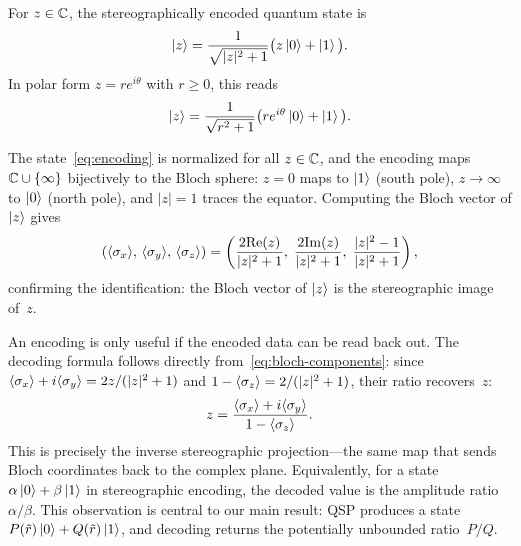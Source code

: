 \begin{definition}
	\label{def:stereo-encoding}
	For $z \in \mathbb{C}$, the stereographically encoded quantum state is
	\begin{equation}
		\ket{z} = \frac{1}{\sqrt{|z|^2 + 1}}\big(z\ket{0} + \ket{1}\big).
		\label{eq:encoding}
	\end{equation}
	In polar form $z = re^{i\theta}$ with $r \geq 0$, this reads
	\begin{equation}
		\ket{z} = \frac{1}{\sqrt{r^2+1}}\big(re^{i\theta}\ket{0} + \ket{1}\big).
		\label{eq:encoding-polar}
	\end{equation}
\end{definition}

The state~\eqref{eq:encoding} is normalized for all $z \in \mathbb{C}$,
and the encoding maps $\mathbb{C} \cup \{\infty\}$ bijectively to the
Bloch sphere: $z = 0$ maps to $\ket{1}$ (south pole),
$z \to \infty$ to $\ket{0}$ (north pole), and $|z| = 1$ traces
the equator.  Computing the Bloch vector of $\ket{z}$ gives
\begin{equation}
	\left(\langle\sigma_x\rangle,\,
	\langle\sigma_y\rangle,\,
	\langle\sigma_z\rangle\right) =
	\left(\frac{2\mathrm{Re}(z)}{|z|^2+1},\;
	\frac{2\mathrm{Im}(z)}{|z|^2+1},\;
	\frac{|z|^2-1}{|z|^2+1}\right),
	\label{eq:bloch-components}
\end{equation}
confirming the identification: the Bloch vector of $\ket{z}$ is
the stereographic image of~$z$.

An encoding is only useful if the encoded data can be read back
out.  The decoding formula follows directly
from~\eqref{eq:bloch-components}: since
$\langle\sigma_x\rangle + i\langle\sigma_y\rangle = 2z/(|z|^2+1)$
and $1 - \langle\sigma_z\rangle = 2/(|z|^2+1)$, their ratio
recovers~$z$:
\begin{equation}
	z = \frac{\langle\sigma_x\rangle + i\langle\sigma_y\rangle}
	{1 - \langle\sigma_z\rangle}.
	\label{eq:decoding}
\end{equation}
This is precisely the inverse stereographic projection---the same
map that sends Bloch coordinates back to the complex plane.
Equivalently, for a state
$\alpha\ket{0} + \beta\ket{1}$ in stereographic encoding, the
decoded value is the amplitude ratio $\alpha/\beta$.  This
observation is central to our main result: QSP produces a state
$P(\tilde{r})\ket{0} + Q(\tilde{r})\ket{1}$, and decoding returns
the potentially unbounded ratio~$P/Q$.

